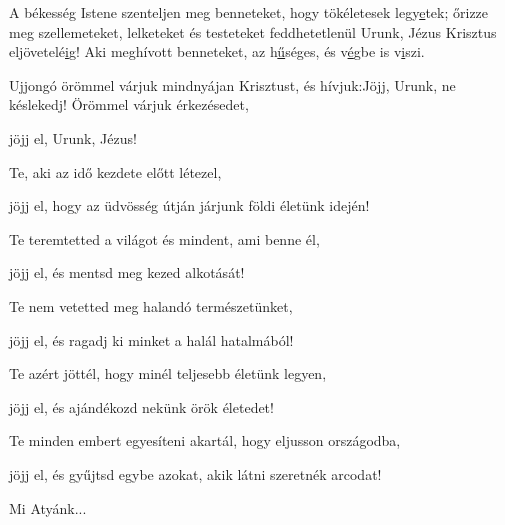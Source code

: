 \documentclass[twoside]{article}
\begin{document}
A békesség Istene szenteljen meg benneteket, hogy tökéletesek legy\underline{e}tek; őrizze meg szellemeteket, lelketeket és testeteket feddhetetlenül Urunk, Jézus Krisztus eljövetelé\underline{i}g! Aki meghívott benneteket, az h\underline{ű}séges, és v\underline{é}gbe is v\underline{i}szi.


\begin{psalmsheet}[tone=1, continuous, initium, title={A lélek az Úrban ujjong}]
\end{psalmsheet}

\begin{preces}{Ujjongó örömmel várjuk mindnyájan Krisztust, és hívjuk:}{Jöjj, Urunk, ne késlekedj!}
  Örömmel várjuk érkezésedet,

  \reddash jöjj el, Urunk, Jézus!

  Te, aki az idő kezdete előtt létezel,

  \reddash jöjj el, hogy az üdvösség útján járjunk földi életünk idején!

  Te teremtetted a világot és mindent, ami benne él,

  \reddash jöjj el, és mentsd meg kezed alkotását!

  Te nem vetetted meg halandó természetünket,

  \reddash jöjj el, és ragadj ki minket a halál hatalmából!

  Te azért jöttél, hogy minél teljesebb életünk legyen,

  \reddash jöjj el, és ajándékozd nekünk örök életedet!

  Te minden embert egyesíteni akartál, hogy eljusson országodba,

  \reddash jöjj el, és gyűjtsd egybe azokat, akik látni szeretnék arcodat!
\end{preces}
Mi Atyánk...
\end{document}
